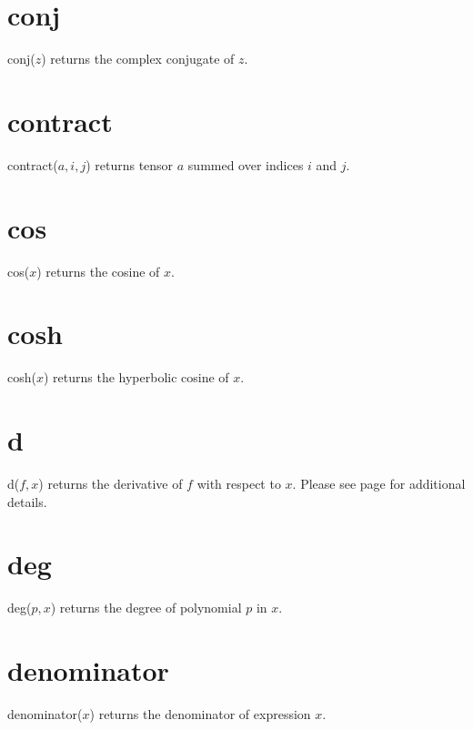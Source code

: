 \documentclass[12pt,openany]{report}
\begin{document}
\section*{conj}
conj($z$) returns the complex conjugate of $z$.

\section*{contract}
contract($a,i,j$) returns tensor $a$ summed over indices $i$ and $j$.

\section*{cos}
cos($x$) returns the cosine of $x$.

\section*{cosh}
cosh($x$) returns the hyperbolic cosine of $x$.

\section*{d}
d($f,x$) returns the derivative of $f$ with respect to $x$.
Please see page \pageref{d} for additional details.

\section*{deg}
deg($p,x$) returns the degree of polynomial $p$ in $x$.

\section*{denominator}
denominator($x$) returns the denominator of expression $x$.
\end{document}
